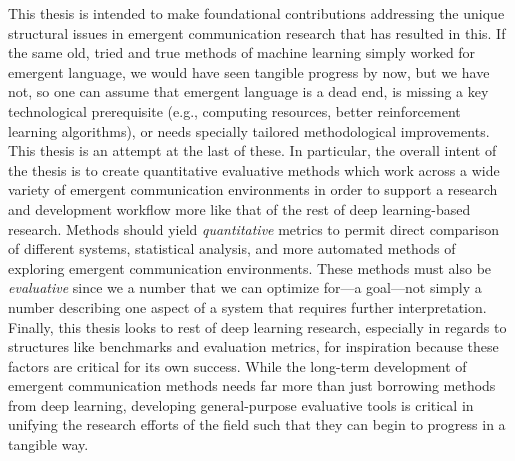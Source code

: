 This thesis is intended to make foundational contributions addressing the unique structural issues in emergent communication research that has resulted in this.
If the same old, tried and true methods of machine learning simply worked for emergent language, we would have seen tangible progress by now, but we have not, so one can assume that emergent language is a dead end, is missing a key technological prerequisite (e.g., computing resources, better reinforcement learning algorithms), or needs specially tailored methodological improvements.
This thesis is an attempt at the last of these.
In particular, the overall intent of the thesis is to create quantitative evaluative methods which work across a wide variety of emergent communication environments in order to support a research and development workflow more like that of the rest of deep learning-based research.
Methods should yield \emph{quantitative} metrics to permit direct comparison of different systems, statistical analysis, and more automated methods of exploring emergent communication environments.
These methods must also be \emph{evaluative} since we a number that we can optimize for---a goal---not simply a number describing one aspect of a system that requires further interpretation.
Finally, this thesis looks to rest of deep learning research, especially in regards to structures like benchmarks and evaluation metrics, for inspiration because these factors are critical for its own success.
While the long-term development of emergent communication methods needs far more than just borrowing methods from deep learning, developing general-purpose evaluative tools is critical in unifying the research efforts of the field such that they can begin to progress in a tangible way.

